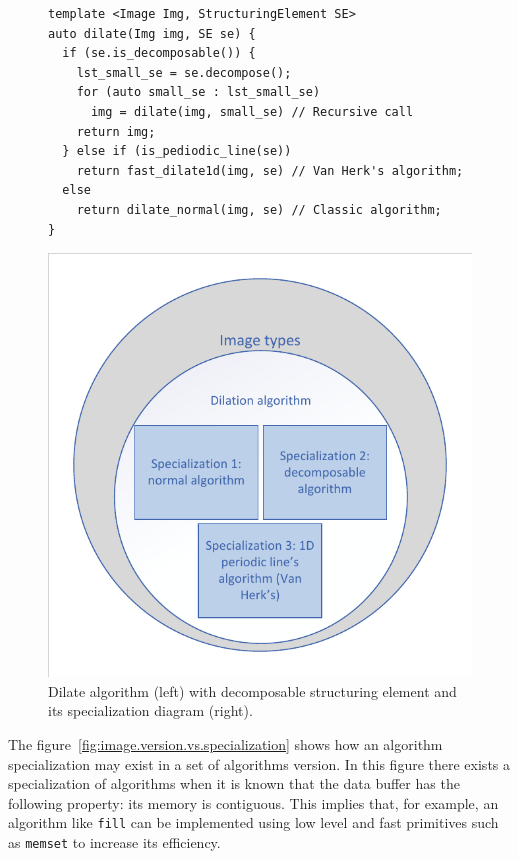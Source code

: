 \begin{figure}[htbp]
  \begin{minipage}[l]{0.48\linewidth}
    \begin{verbatim}
template <Image Img, StructuringElement SE>
auto dilate(Img img, SE se) {
  if (se.is_decomposable()) {
    lst_small_se = se.decompose();
    for (auto small_se : lst_small_se)
      img = dilate(img, small_se) // Recursive call
    return img;
  } else if (is_pediodic_line(se))
    return fast_dilate1d(img, se) // Van Herk's algorithm;
  else
    return dilate_normal(img, se) // Classic algorithm;
}
\end{verbatim}
  \end{minipage}
  \hfill
  \begin{minipage}[r]{0.48\linewidth}
    \centering
    \includegraphics[scale=0.5]{../figures/dilation_specialization_diagram}
  \end{minipage}
  \caption{Dilate algorithm (left) with decomposable structuring element and its specialization diagram (right).}
  \label{fig:dilation.specialization.alg.diagram}
\end{figure}

The figure~\ref{fig:image.version.vs.specialization} shows how an algorithm specialization may exist in a set of algorithms
version. In this figure there exists a specialization of algorithms when it is known that the data buffer has the
following property: its memory is contiguous. This implies that, for example, an algorithm like \texttt{fill} can be
implemented using low level and fast primitives such as \texttt{memset} to increase its efficiency.

